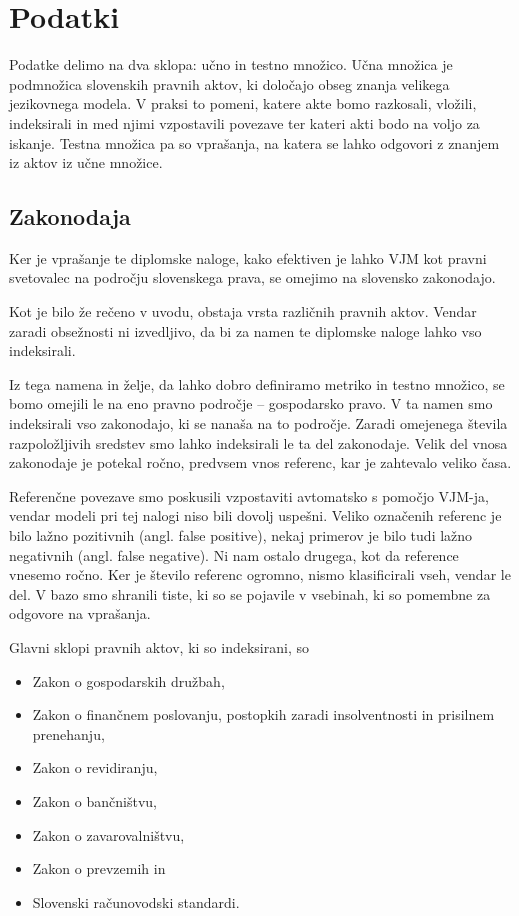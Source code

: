 \documentclass[a4paper,12pt,openright]{book}
\begin{document}
\chapter{Podatki}
\label{ch2}

Podatke delimo na dva sklopa: učno in testno množico. Učna množica je podmnožica slovenskih pravnih aktov, ki določajo obseg znanja velikega jezikovnega modela. V praksi to pomeni, katere akte bomo razkosali, vložili, indeksirali in med njimi vzpostavili povezave ter kateri akti bodo na voljo za iskanje. Testna množica pa so vprašanja, na katera se lahko odgovori z znanjem iz aktov iz učne množice.

\section{Zakonodaja}

Ker je vprašanje te diplomske naloge, kako efektiven je lahko VJM kot pravni svetovalec na področju slovenskega prava, se omejimo na slovensko zakonodajo.

Kot je bilo že rečeno v uvodu, obstaja vrsta različnih pravnih aktov. Vendar zaradi obsežnosti ni izvedljivo, da bi za namen te diplomske naloge lahko vso indeksirali.

Iz tega namena in želje, da lahko dobro definiramo metriko in testno množico, se bomo omejili le na eno pravno področje – gospodarsko pravo. V ta namen smo indeksirali vso zakonodajo, ki se nanaša na to področje. Zaradi omejenega števila razpoložljivih sredstev smo lahko indeksirali le ta del zakonodaje. Velik del vnosa zakonodaje je potekal ročno, predvsem vnos referenc, kar je zahtevalo veliko časa.

Referenčne povezave smo poskusili vzpostaviti avtomatsko s pomočjo VJM-ja, vendar modeli pri tej nalogi niso bili dovolj uspešni. Veliko označenih referenc je bilo lažno pozitivnih (angl. false positive), nekaj primerov je bilo tudi lažno negativnih (angl. false negative). Ni nam ostalo drugega, kot da reference vnesemo ročno. Ker je število referenc ogromno, nismo klasificirali vseh, vendar le del. V bazo smo shranili tiste, ki so se pojavile v vsebinah, ki so pomembne za odgovore na vprašanja.

Glavni sklopi pravnih aktov, ki so indeksirani, so

\begin{itemize}
	\item Zakon o gospodarskih družbah,
	\item Zakon o finančnem poslovanju, postopkih zaradi insolventnosti in prisilnem prenehanju,
	\item Zakon o revidiranju,
	\item Zakon o bančništvu,
	\item Zakon o zavarovalništvu,
	\item Zakon o prevzemih in
	\item Slovenski računovodski standardi.
\end{itemize}
\end{document}

